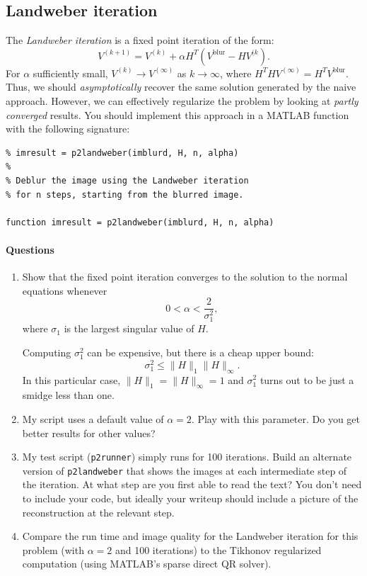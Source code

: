 \documentclass[12pt, leqno]{article} %
\begin{document}
\subsection{Landweber iteration}

The {\em Landweber iteration} is a fixed point iteration of the form:
\[
  V^{(k+1)} = V^{(k)} + \alpha H^T (V^{\mathrm{blur}}-H V^{(k}).
\]
For $\alpha$ sufficiently small, $V^{(k)} \rightarrow V^{(\infty)}$ as
$k \rightarrow \infty$, where $H^T H V^{(\infty)} = H^T
V^{\mathrm{blur}}$.  Thus, we should {\em asymptotically} recover the
same solution generated by the naive approach.  However, we can
effectively regularize the problem by looking at {\em partly
  converged} results.  You should implement this approach in a MATLAB
function with the following signature:
\begin{lstlisting}
% imresult = p2landweber(imblurd, H, n, alpha)
%
% Deblur the image using the Landweber iteration
% for n steps, starting from the blurred image.

function imresult = p2landweber(imblurd, H, n, alpha)
\end{lstlisting}

\paragraph*{Questions}

\begin{enumerate}
\item
  Show that the fixed point iteration converges to the solution to the
  normal equations whenever
  \[
    0 < \alpha < \frac{2}{\sigma_1^2},
  \]
  where $\sigma_1$ is the largest singular value of $H$.

  Computing $\sigma_1^2$ can be expensive, but there is a cheap upper
  bound:
  \[
  \sigma_1^2 \leq \|H\|_1 \|H\|_{\infty}.
  \]
  In this particular case, $\|H\|_1 = \|H\|_{\infty} = 1$ and
  $\sigma_1^2$ turns out to be just a smidge less than one.

\item
  My script uses a default value of $\alpha = 2$.  Play with this
  parameter.  Do you get better results for other values?
\item
  My test script ({\tt p2runner}) simply runs for 100 iterations.
  Build an alternate version of {\tt p2landweber} that shows the
  images at each intermediate step of the iteration.  At what step are
  you first able to read the text?  You don't need to include your
  code, but ideally your writeup should include a picture of the
  reconstruction at the relevant step.
\item
  Compare the run time and image quality for the Landweber iteration
  for this problem (with $\alpha = 2$ and 100 iterations) to the 
  Tikhonov regularized computation (using MATLAB's sparse direct QR
  solver).
\end{enumerate}
\end{document}

